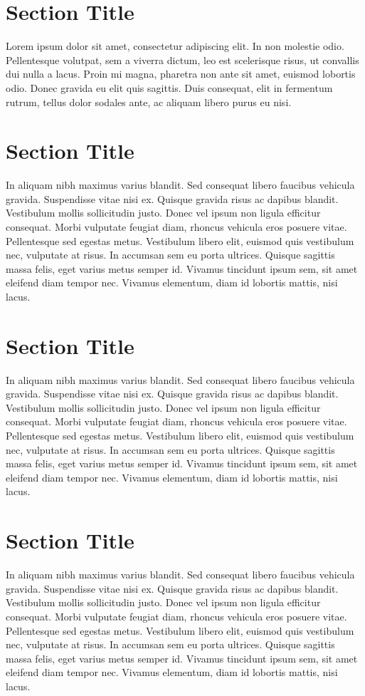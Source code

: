 \documentclass[12pt]{report}
\begin{document}
\section{Section Title}
Lorem ipsum dolor sit amet, consectetur adipiscing elit. In non molestie odio. Pellentesque volutpat, sem a viverra dictum, leo est scelerisque risus, ut convallis dui nulla a lacus. Proin mi magna, pharetra non ante sit amet, euismod lobortis odio. Donec gravida eu elit quis sagittis. Duis consequat, elit in fermentum rutrum, tellus dolor sodales ante, ac aliquam libero purus eu nisi. 


\section{Section Title}
In aliquam nibh maximus varius blandit. Sed consequat libero faucibus vehicula gravida. Suspendisse vitae nisi ex. Quisque gravida risus ac dapibus blandit. Vestibulum mollis sollicitudin justo. Donec vel ipsum non ligula efficitur consequat. Morbi vulputate feugiat diam, rhoncus vehicula eros posuere vitae. Pellentesque sed egestas metus. Vestibulum libero elit, euismod quis vestibulum nec, vulputate at risus. In accumsan sem eu porta ultrices. Quisque sagittis massa felis, eget varius metus semper id. Vivamus tincidunt ipsum sem, sit amet eleifend diam tempor nec. Vivamus elementum, diam id lobortis mattis, nisi lacus.

\section{Section Title}
In aliquam nibh maximus varius blandit. Sed consequat libero faucibus vehicula gravida. Suspendisse vitae nisi ex. Quisque gravida risus ac dapibus blandit. Vestibulum mollis sollicitudin justo. Donec vel ipsum non ligula efficitur consequat. Morbi vulputate feugiat diam, rhoncus vehicula eros posuere vitae. Pellentesque sed egestas metus. Vestibulum libero elit, euismod quis vestibulum nec, vulputate at risus. In accumsan sem eu porta ultrices. Quisque sagittis massa felis, eget varius metus semper id. Vivamus tincidunt ipsum sem, sit amet eleifend diam tempor nec. Vivamus elementum, diam id lobortis mattis, nisi lacus.


\section{Section Title}
In aliquam nibh maximus varius blandit. Sed consequat libero faucibus vehicula gravida. Suspendisse vitae nisi ex. Quisque gravida risus ac dapibus blandit. Vestibulum mollis sollicitudin justo. Donec vel ipsum non ligula efficitur consequat. Morbi vulputate feugiat diam, rhoncus vehicula eros posuere vitae. Pellentesque sed egestas metus. Vestibulum libero elit, euismod quis vestibulum nec, vulputate at risus. In accumsan sem eu porta ultrices. Quisque sagittis massa felis, eget varius metus semper id. Vivamus tincidunt ipsum sem, sit amet eleifend diam tempor nec. Vivamus elementum, diam id lobortis mattis, nisi lacus.
\end{document}
